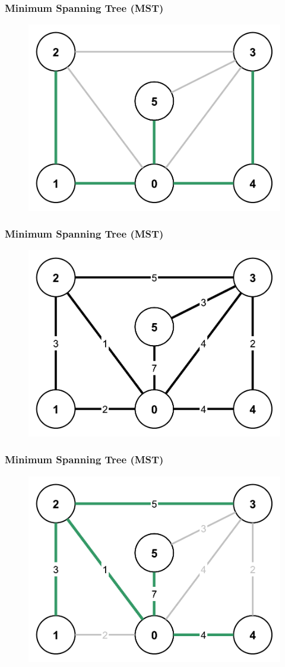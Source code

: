 \begin{frame}
\frametitle{Minimum Spanning Tree (MST)}
\begin{figure}
\includegraphics[width=0.75\linewidth]{kruskal_graphs/spanningtree2.pdf}
\end{figure}
\end{frame}

\begin{frame}
\frametitle{Minimum Spanning Tree (MST)}
\begin{figure}
\includegraphics[width=0.75\linewidth]{kruskal_graphs/basic.pdf}
\end{figure}
\end{frame}

\begin{frame}
\frametitle{Minimum Spanning Tree (MST)}
\begin{figure}
\includegraphics[width=0.75\linewidth]{kruskal_graphs/spanningtree1_weights.pdf}
\end{figure}
\end{frame}


